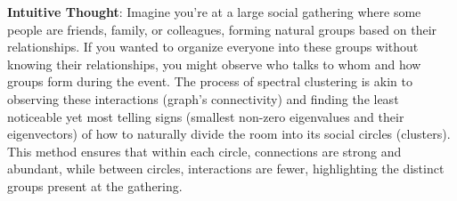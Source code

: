 \documentclass[11pt]{article}
\begin{document}
\textbf{Intuitive Thought}: Imagine you're at a large social gathering
where some people are friends, family, or colleagues, forming natural
groups based on their relationships. If you wanted to organize everyone
into these groups without knowing their relationships, you might observe
who talks to whom and how groups form during the event. The process of
spectral clustering is akin to observing these interactions (graph's
connectivity) and finding the least noticeable yet most telling signs
(smallest non-zero eigenvalues and their eigenvectors) of how to
naturally divide the room into its social circles (clusters). This
method ensures that within each circle, connections are strong and
abundant, while between circles, interactions are fewer, highlighting
the distinct groups present at the gathering.


    
    
    
\end{document}
